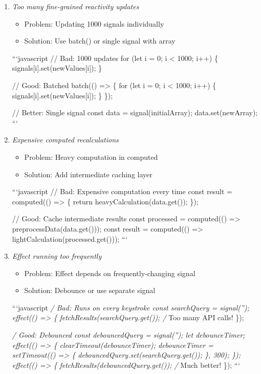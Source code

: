 \documentclass[11pt]{article}
\begin{document}
\begin{enumerate}
\item \emph{Too many fine-grained reactivity updates}
\begin{itemize}
\item Problem: Updating 1000 signals individually
\item Solution: Use batch() or single signal with array
\end{itemize}

```javascript
// Bad: 1000 updates
for (let i = 0; i < 1000; i++) \{
  signals[i].set(newValues[i]);
\}

// Good: Batched
batch(() => \{
  for (let i = 0; i < 1000; i++) \{
    signals[i].set(newValues[i]);
  \}
\});

// Better: Single signal
const data = signal(initialArray);
data.set(newArray);
```

\item \emph{Expensive computed recalculations}
\begin{itemize}
\item Problem: Heavy computation in computed
\item Solution: Add intermediate caching layer
\end{itemize}

```javascript
// Bad: Expensive computation every time
const result = computed(() => \{
  return heavyCalculation(data.get());
\});

// Good: Cache intermediate results
const processed = computed(() => preprocessData(data.get()));
const result = computed(() => lightCalculation(processed.get()));
```

\item \emph{Effect running too frequently}
\begin{itemize}
\item Problem: Effect depends on frequently-changing signal
\item Solution: Debounce or use separate signal
\end{itemize}

```javascript
\emph{/ Bad: Runs on every keystroke
const searchQuery = signal('');
effect(() => \{
  fetchResults(searchQuery.get()); /} Too many API calls!
\});

\emph{/ Good: Debounced
const debouncedQuery = signal('');
let debounceTimer;
effect(() => \{
  clearTimeout(debounceTimer);
  debounceTimer = setTimeout(() => \{
    debouncedQuery.set(searchQuery.get());
  \}, 300);
\});
effect(() => \{
  fetchResults(debouncedQuery.get()); /} Much better!
\});
```


\end{enumerate}
\end{document}
